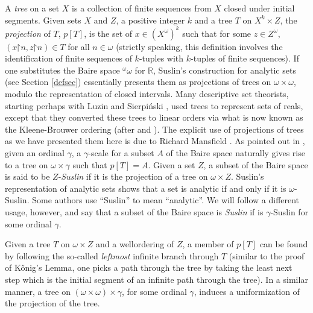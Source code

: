 \documentclass{book}%
\newcommand{\breals}{{^{\omega}}\omega}
\newcommand{\restrict}{\mathord{\upharpoonright}}
\begin{document}
A \emph{tree} on a set $X$ is a collection of finite sequences from $X$ closed under initial segments. Given sets  $X$ and $Z$, a positive integer $k$ and a tree
$T$ on $X^{k} \times Z$, the \emph{projection} of $T$, $p[T]$, is the set of
$x \in (X^{\omega})^{k}$ such that for some $z \in Z^{\omega}$, $(x \restrict
n, z \restrict n) \in T$ for all $n \in \omega$ (strictly speaking, this definition involves the identification of finite sequences of $k$-tuples with $k$-tuples of finite sequences). If one substitutes the Baire space $\breals$ for $\mathbb{R}$, Suslin's construction for analytic sets (see Section \ref{defsec}) essentially presents them as projections of trees on $\omega \times \omega$, modulo the representation of closed intervals. Many descriptive set theorists, starting perhaps with Luzin and Sierpi\'{n}ski , used trees to represent sets of reals, except that they converted these trees to linear orders via what is now known as the Kleene-Brouwer ordering (after \cite{Brouwer:1924} and \cite{Kleene:1955ajm}). The explicit use of projections of trees as we have presented them here is due to Richard Mansfield . As pointed out in \cite{KechrisMoschovakis:1978}, given an ordinal $\gamma$, a $\gamma$-scale for a subset $A$ of the Baire space naturally gives rise to a tree on $\omega \times \gamma$ such that $p[T] = A$. Given a set $Z$, a subset of the Baire space is said to be
$Z$-\emph{Suslin} if it is the projection of a tree on $\omega \times Z$. Suslin's representation of analytic sets shows that a set is analytic if and only if it is $\omega$-Suslin. Some authors use ``Suslin'' to mean ``analytic''. We will follow a different usage, however, and say that a subset of the Baire space is \emph{Suslin}
if is $\gamma$-Suslin for some ordinal $\gamma$.




Given a tree $T$ on $\omega \times Z$ and a
wellordering of $Z$, a member of $p[T]$ can be found by following
the so-called \emph{leftmost} infinite branch through $T$ (similar
to the proof of K\H{o}nig's Lemma, one picks a path through the tree
by taking the least next step which is the initial segment of an
infinite path through the tree). In a similar manner, a tree on $(\omega \times \omega) \times \gamma$, for
some ordinal $\gamma$, induces a uniformization of the projection of the tree.
\end{document}
